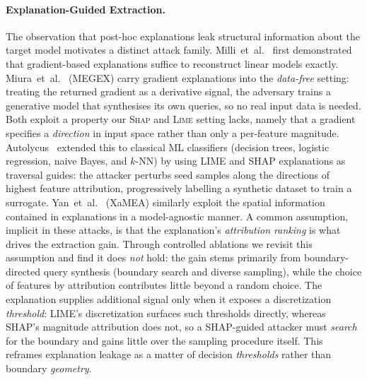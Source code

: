 \documentclass[sigconf,anonymous,review]{acmart}
\begin{document}
\paragraph{Explanation-Guided Extraction.}
The observation that post-hoc explanations leak structural information about the
target model motivates a distinct attack family.
Milli~et~al.~\cite{milli2019model} first demonstrated that gradient-based explanations
suffice to reconstruct linear models exactly.
Miura~et~al.~\cite{miura2024megex} (MEGEX) carry gradient explanations into the \emph{data-free}
setting: treating the returned gradient as a derivative signal, the adversary trains a generative
model that synthesises its own queries, so no real input data is needed. Both exploit a property our
\textsc{Shap} and \textsc{Lime} setting lacks, namely that a gradient specifies a \emph{direction} in
input space rather than only a per-feature magnitude.
Autolycus~\cite{oksuz2024autolycus} extended this to classical ML classifiers
(decision trees, logistic regression, naive Bayes, and $k$-NN) by using LIME and SHAP
explanations as traversal guides: the attacker perturbs seed samples along the
directions of highest feature attribution, progressively labelling a synthetic dataset
to train a surrogate. Yan~et~al.~\cite{yan2023explanationleaks} (XaMEA) similarly
exploit the spatial information contained in explanations in a model-agnostic manner.
A common assumption, implicit in these attacks, is that the explanation's
\emph{attribution ranking} is what drives the extraction gain.
Through controlled ablations we revisit this assumption and find it does \emph{not}
hold: the gain stems primarily from boundary-directed query synthesis (boundary search and diverse sampling), while the choice of features by attribution
contributes little beyond a random choice. The explanation supplies additional signal
only when it exposes a discretization \emph{threshold}: LIME's discretization surfaces such
thresholds directly, whereas SHAP's magnitude attribution does not, so a SHAP-guided
attacker must \emph{search} for the boundary and gains little over the sampling
procedure itself. This reframes explanation leakage as a matter of decision
\emph{thresholds} rather than boundary \emph{geometry}.
\end{document}
